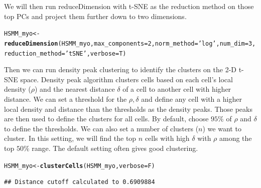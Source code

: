 \documentclass[10pt,oneside]{article}\usepackage[]{graphicx}\usepackage[]{color}
\makeatletter
\newcommand{\hlnum}[1]{\textcolor[rgb]{0.686,0.059,0.569}{#1}}%
\newcommand{\hlstr}[1]{\textcolor[rgb]{0.192,0.494,0.8}{#1}}%
\newcommand{\hlstd}[1]{\textcolor[rgb]{0.345,0.345,0.345}{#1}}%
\newcommand{\hlkwb}[1]{\textcolor[rgb]{0.69,0.353,0.396}{#1}}%
\newcommand{\hlkwc}[1]{\textcolor[rgb]{0.333,0.667,0.333}{#1}}%
\newcommand{\hlkwd}[1]{\textcolor[rgb]{0.737,0.353,0.396}{\textbf{#1}}}%
\newenvironment{kframe}{%
 \def\at@end@of@kframe{}%
 \ifinner\ifhmode%
  \def\at@end@of@kframe{\end{minipage}}%
  \begin{minipage}{\columnwidth}%
 \fi\fi%
 \def\FrameCommand##1{\hskip\@totalleftmargin \hskip-\fboxsep
 \colorbox{shadecolor}{##1}\hskip-\fboxsep
     \hskip-\linewidth \hskip-\@totalleftmargin \hskip\columnwidth}%
 \MakeFramed {\advance\hsize-\width
   \@totalleftmargin\z@ \linewidth\hsize
   \@setminipage}}%
 {\par\unskip\endMakeFramed%
 \at@end@of@kframe}
\newenvironment{knitrout}{}{} %
\makeatother
\begin{document}
We will then run reduceDimension with t-SNE as the reduction method on those top PCs and project them further down to two dimensions.  
\begin{knitrout}
\color{fgcolor}\begin{kframe}
\begin{alltt}
  \hlstd{HSMM_myo} \hlkwb{<-} \hlkwd{reduceDimension}\hlstd{(HSMM_myo,} \hlkwc{max_components}\hlstd{=}\hlnum{2}\hlstd{,} \hlkwc{norm_method} \hlstd{=} \hlstr{'log'}\hlstd{,} \hlkwc{num_dim} \hlstd{=} \hlnum{3}\hlstd{,}
                              \hlkwc{reduction_method} \hlstd{=} \hlstr{'tSNE'}\hlstd{,} \hlkwc{verbose} \hlstd{= T)}
\end{alltt}


{\ttfamily\noindent\itshape\color{messagecolor}{\#\# Remove noise by PCA ...}}

{\ttfamily\noindent\itshape\color{messagecolor}{\#\# Reduce dimension by tSNE ...}}\end{kframe}
\end{knitrout}

Then we can run density peak clustering to identify the clusters on the 2-D t-SNE space. Density peak algorithm clusters cells based on each 
cell's local density ($\rho$) and the nearest distance $\delta$ of a cell to another cell with higher distance. We can set a threshold for 
the $\rho, \delta$ and define any cell with a higher local density and distance than the thresholds as the density peaks. Those peaks are then 
used to define the clusters for all cells. By default,  choose $95\%$ of $\rho$ and $\delta$ to define 
the thresholds. We can also set a number of clusters ($n$) we want to cluster. In this setting, we will find the top $n$ cells with high 
$\delta$ with $\rho$ among the top $50\%$ range. The default setting often gives good clustering. 

\begin{knitrout}
\color{fgcolor}\begin{kframe}
\begin{alltt}
\hlstd{HSMM_myo} \hlkwb{<-} \hlkwd{clusterCells}\hlstd{(HSMM_myo,} \hlkwc{verbose} \hlstd{= F)}
\end{alltt}
\begin{verbatim}
## Distance cutoff calculated to 0.6909884
\end{verbatim}


{\ttfamily\noindent\itshape\color{messagecolor}{\#\# the length of the distance: 11935}}\end{kframe}
\end{knitrout}
\end{document}

